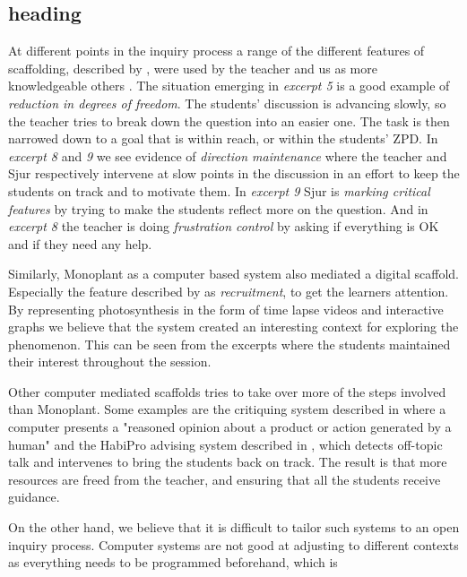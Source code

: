 \subsection{heading}
At different points in the inquiry process a range of the different features of scaffolding, described by \citet{wood1976role}, were used by the teacher and us as more knowledgeable others \citep{vygotskiui1978mind}. The situation emerging in \emph{excerpt 5} is a good example of \emph{reduction in degrees of freedom}. The students' discussion is advancing slowly, so the teacher tries to break down the question into an easier one. The task is then narrowed down to a goal that is within reach, or within the students' ZPD. In \emph{excerpt 8} and \emph{9} we see evidence of \emph{direction maintenance} where the teacher and Sjur respectively intervene at slow points in the discussion in an effort to keep the students on track and to motivate them. In \emph{excerpt 9} Sjur is \emph{marking critical features} by trying to make the students reflect more on the question. And in \emph{excerpt 8} the teacher is doing \emph{frustration control} by asking if everything is OK and if they need any help. 

Similarly, Monoplant as a computer based system also mediated a digital scaffold. Especially the feature described by \citet{wood1976role} as \emph{recruitment}, to get the learners attention. By representing photosynthesis in the form of time lapse videos and interactive graphs we believe that the system created an interesting context for exploring the phenomenon. This can be seen from the excerpts where the students maintained their interest throughout the session. 

Other computer mediated scaffolds tries to take over more of the steps involved than Monoplant. Some examples are the critiquing system described in \citet{fischer1991critics} where a computer presents a "reasoned opinion about a product or action generated by a human" and the HabiPro advising system described in \citet{soller2005mirroring}, which detects off-topic talk and intervenes to bring the students back on track. The result is that more resources are freed from the teacher, and ensuring that all the students receive guidance. 

On the other hand, we believe that it is difficult to tailor such systems to an open inquiry process. Computer systems are not good at adjusting to different contexts as everything needs to be programmed beforehand, which is 


